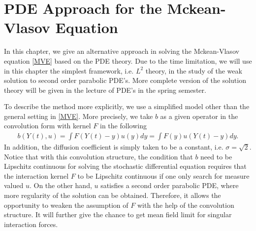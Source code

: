 \chapter{PDE Approach for the Mckean-Vlasov Equation}

In this chapter, we give an alternative approach in solving the Mckean-Vlasov equation \autoref{MVE} based on the PDE theory. Due to the time limitation, we will use in this chapter the simplest framework, i.e. $L^2$ theory, in the study of the weak solution to second order parabolic PDE's. More complete version of the solution theory will be given in the lecture of PDE's in the spring semester.

To describe the method more explicitly, we use a simplified model other than the general setting in \autoref{MVE}. More precisely, we take $b$ as a given operator in the convolution form with kernel $F$ in the following
\begin{align*}
	b(Y(t),u) = \int F(Y(t)-y)u(y) dy = \int F(y)u(Y(t)-y) dy
.\end{align*}
In addition, the diffusion coefficient is simply taken to be a constant, i.e. $\sigma=\sqrt{2}$. Notice that with this convolution structure, the condition that $b$ need to be Lipschitz continuous for solving the stochastic differential equation requires that the interaction kernel $F$ to be Lipschitz continuous if one only search for measure valued $u$. On the other hand, $u$ satisfies a second order parabolic PDE, where more regularity of the solution can be obtained. Therefore, it allows the opportunity to weaken the assumption of $F$ with the help of the convolution structure. It will further give the chance to get mean field limit for singular interaction forces.

